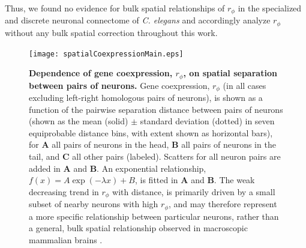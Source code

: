 \documentclass[10pt,letterpaper]{article}
\begin{document}
Thus, we found no evidence for bulk spatial relationships of $r_\phi$ in the specialized and discrete neuronal connectome of \emph{C. elegans} and accordingly analyze $r_\phi$ without any bulk spatial correction throughout this work.

\begin{figure}[h]
  \centering
    \texttt{[image: spatialCoexpressionMain.eps]}
  \caption{
  \textbf{Dependence of gene coexpression, $r_\phi$, on spatial separation between pairs of neurons.}
  Gene coexpression, $r_\phi$ (in all cases excluding left-right homologous pairs of neurons), is shown as a function of the pairwise separation distance between pairs of neurons (shown as the mean (solid) $\pm$ standard deviation (dotted) in seven equiprobable distance bins, with extent shown as horizontal bars), for \textbf{A} all pairs of neurons in the head, \textbf{B} all pairs of neurons in the tail, and \textbf{C} all other pairs (labeled).
  Scatters for all neuron pairs are added in \textbf{A} and \textbf{B}.
  An exponential relationship, $f(x) = A\exp(-\lambda x) + B$, is fitted in \textbf{A} and \textbf{B}.
  The weak decreasing trend in $r_\phi$ with distance, is primarily driven by a small subset of nearby neurons with high $r_\phi$, and may therefore represent a more specific relationship between particular neurons, rather than a general, bulk spatial relationship observed in macroscopic mammalian brains \cite{Fulcher:2016ck, Krienen:2016eq}.
\label{fig:spatialCoexpressionMain}
  }
\end{figure}
\end{document}
